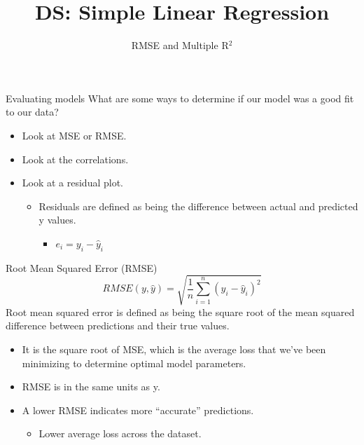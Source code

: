 \documentclass[aspectratio=169]{../latex_main/tntbeamer}  %
\title[Regression]{DS: Simple Linear Regression}
\subtitle{RMSE and Multiple R$^2$}
\begin{document}
	
	\maketitle
	\begin{frame}{Evaluating models}
	    What are some ways to determine if our model was a good fit to our data?
	    \begin{itemize}
	        \item Look at MSE or RMSE.
	        \item Look at the correlations.
	        \item Look at a residual plot.
	        \begin{itemize}
	            \item Residuals are defined as being the difference between actual and predicted y values. 
	            \begin{itemize}
	                \item  $e_i = y_i - \hat{y}_i$
	            \end{itemize}
	        \end{itemize}
	    \end{itemize}
	\end{frame}
	
	
	\begin{frame}{Root Mean Squared Error (RMSE)}
	    \begin{equation*}
	        RMSE(y,\hat{y}) = \sqrt{\frac{1}{n}\sum\limits_{i=1}^n(y_i - \hat{y}_i)^2}
	    \end{equation*}
	    Root mean squared error is defined as being the square root of the mean squared difference between predictions and their true values.

	    \begin{itemize}
	        \item It is the square root of MSE, which is the average loss that we’ve been minimizing to determine optimal model parameters.
	        \item \alert{RMSE is in the same units as y}.
	        \item A lower RMSE indicates more “accurate” predictions.
	        \begin{itemize}
	            \item Lower average loss across the dataset.
	        \end{itemize}
	    \end{itemize}
	\end{frame}
	
	
	
\end{document}
